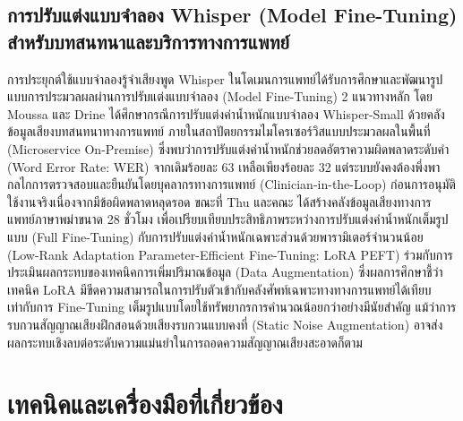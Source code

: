 \subsection{การปรับแต่งแบบจำลอง Whisper (Model Fine-Tuning) สำหรับบทสนทนาและบริการทางการแพทย์}
การประยุกต์ใช้แบบจำลองรู้จำเสียงพูด Whisper ในโดเมนการแพทย์ได้รับการศึกษาและพัฒนารูปแบบการประมวลผลผ่านการปรับแต่งแบบจำลอง (Model Fine-Tuning) 2 แนวทางหลัก โดย Moussa และ Drine \cite{moussa2026finetuning} ได้ศึกษากรณีการปรับแต่งค่าน้ำหนักแบบจำลอง Whisper-Small ด้วยคลังข้อมูลเสียงบทสนทนาทางการแพทย์ ภายในสถาปัตยกรรมไมโครเซอร์วิสแบบประมวลผลในพื้นที่ (Microservice On-Premise) ซึ่งพบว่าการปรับแต่งค่าน้ำหนักช่วยลดอัตราความผิดพลาดระดับคำ (Word Error Rate: WER) จากเดิมร้อยละ 63 เหลือเพียงร้อยละ 32 แต่ระบบยังคงต้องพึ่งพากลไกการตรวจสอบและยืนยันโดยบุคลากรทางการแพทย์ (Clinician-in-the-Loop) ก่อนการอนุมัติใช้งานจริงเนื่องจากมีข้อผิดพลาดหลุดรอด ขณะที่ Thu และคณะ \cite{thu2026mymediwhisper} ได้สร้างคลังข้อมูลเสียงทางการแพทย์ภาษาพม่าขนาด 28 ชั่วโมง เพื่อเปรียบเทียบประสิทธิภาพระหว่างการปรับแต่งค่าน้ำหนักเต็มรูปแบบ (Full Fine-Tuning) กับการปรับแต่งค่าน้ำหนักเฉพาะส่วนด้วยพารามิเตอร์จำนวนน้อย (Low-Rank Adaptation Parameter-Efficient Fine-Tuning: LoRA PEFT) ร่วมกับการประเมินผลกระทบของเทคนิคการเพิ่มปริมาณข้อมูล (Data Augmentation) ซึ่งผลการศึกษาชี้ว่าเทคนิค LoRA มีขีดความสามารถในการปรับตัวเข้ากับคลังศัพท์เฉพาะทางทางการแพทย์ได้เทียบเท่ากับการ Fine-Tuning เต็มรูปแบบโดยใช้ทรัพยากรการคำนวณน้อยกว่าอย่างมีนัยสำคัญ แม้ว่าการรบกวนสัญญาณเสียงฝึกสอนด้วยเสียงรบกวนแบบคงที่ (Static Noise Augmentation) อาจส่งผลกระทบเชิงลบต่อระดับความแม่นยำในการถอดความสัญญาณเสียงสะอาดก็ตาม

\section{เทคนิคและเครื่องมือที่เกี่ยวข้อง}

